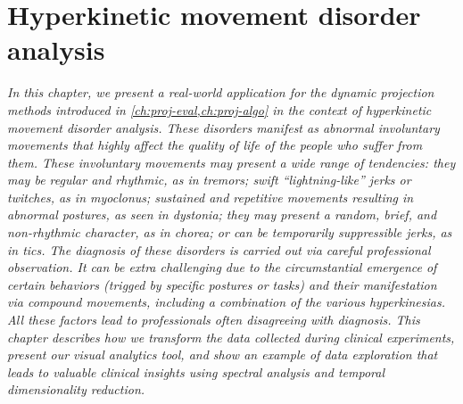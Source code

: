 \chapter{Hyperkinetic movement disorder analysis}
\label{ch:nemo}

\textit{
In this chapter, we present a real-world application for the dynamic projection methods introduced in \cref{ch:proj-eval,ch:proj-algo} in the context of hyperkinetic movement disorder analysis. These disorders manifest as abnormal involuntary movements that highly affect the quality of life of the people who suffer from them. These involuntary movements may present a wide range of tendencies: they may be regular and rhythmic, as in tremors; swift ``lightning-like'' jerks or twitches, as in myoclonus; sustained and repetitive movements resulting in abnormal postures, as seen in dystonia; they may present a random, brief, and non-rhythmic character, as in chorea; or can be temporarily suppressible jerks, as in tics.
The diagnosis of these disorders is carried out via careful professional observation. It can be extra challenging due to the circumstantial emergence of certain behaviors (trigged by specific postures or tasks) and their manifestation via compound movements, including a combination of the various hyperkinesias. All these factors lead to professionals often disagreeing with diagnosis. 
This chapter describes how we transform the data collected during clinical experiments, present our visual analytics tool, and show an example of data exploration that leads to valuable clinical insights using spectral analysis and temporal dimensionality reduction.
}

\vspace{5mm} %


